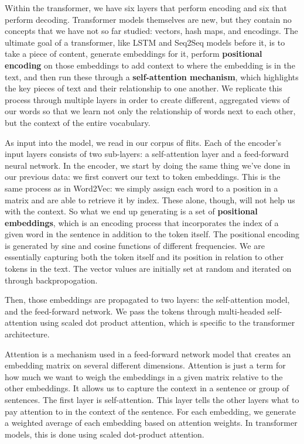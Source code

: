 \documentclass[11pt, table]{diazessay} %
\begin{document}
\begin{sloppypar}
Within the transformer, we have six layers that perform encoding and six that perform decoding.  Transformer models themselves are new, but they contain no concepts that we have not so far studied: vectors, hash maps, and encodings.  The ultimate goal of a transformer, like LSTM and Seq2Seq models before it, is to take a piece of content, generate embeddings for it, perform \textbf{positional encoding} on those embeddings to add context to where the embedding is in the text, and then run these through a \textbf{self-attention mechanism}, which highlights the key pieces of text and their relationship to one another. We replicate this process through multiple layers in order to create different, aggregated views of our words so that we learn not only the relationship of words next to each other, but the context of the entire vocabulary. 

As input into the model, we read in our corpus of flits. Each of the encoder's input layers consists of two sub-layers: a self-attention layer and a feed-forward neural network. In the encoder, we start by doing the same thing we've done in our previous data: we first convert our text to token embeddings. This is the same process as in Word2Vec: we simply assign each word to a position in a matrix and are able to retrieve it by index. These alone, though, will not help us with the context. So what we end up generating is a set of \textbf{positional embeddings}, which is an encoding process that incorporates the index of a given word in the sentence in addition to the token itself. The positional encoding is generated by sine and cosine functions of different frequencies. We are essentially capturing both the token itself and its position in relation to other tokens in the text. The vector values are initially set at random and iterated on through backpropogation. 

Then, those embeddings are propagated to two layers: the self-attention model, and the feed-forward network. We pass the tokens through multi-headed self-attention using scaled dot product attention, which is specific to the transformer architecture. 

Attention is a mechanism used in a feed-forward network model that creates an embedding matrix on several different dimensions. Attention is just a term for how much we want to weigh the embeddings in a given matrix relative to the other embeddings. It allows us to capture the context in a sentence or group of sentences. The first layer is self-attention. This layer tells the other layers what to pay attention to in the context of the sentence.  For each embedding, we generate a weighted average of each embedding based on attention weights. In transformer models, this is done using scaled dot-product attention. 


\end{sloppypar}
\end{document}
